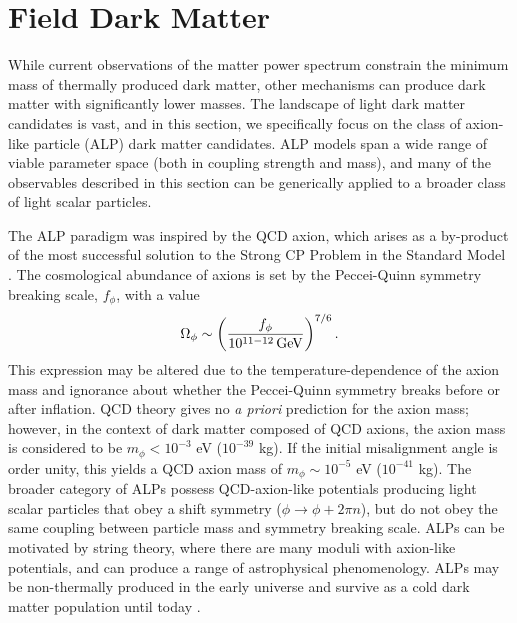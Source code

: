 \section{Field Dark Matter }
\label{sec:axions}

While current observations of the matter power spectrum constrain the minimum mass of thermally produced dark matter, other mechanisms can  produce dark matter with significantly lower masses. The landscape of light dark matter candidates is vast, and in this section, we specifically focus on the class of axion-like particle (ALP) dark matter candidates.
ALP models span a wide range of viable parameter space (both in coupling strength and mass), and many of the observables described in this section can be generically applied to a broader class of light scalar particles.

The ALP paradigm was inspired by the QCD axion, which arises as a by-product of the most successful solution to the Strong CP Problem in the Standard Model \citep{PecceiQuinn:1977}. 
The cosmological abundance of axions is set by the Peccei-Quinn symmetry breaking scale, $f_\phi$, with a value
\begin{equation}
\Omega_\phi\sim\left(\frac{f_\phi}{10^{11-12}\,{\rm GeV}}\right)^{7/6}.
\end{equation}
This expression may be altered due to the temperature-dependence of the axion mass and ignorance about whether the Peccei-Quinn symmetry breaks before or after inflation. 
QCD theory gives no {\it a priori} prediction for the axion mass; however, in the context of dark matter composed of QCD axions, the axion mass is considered to be $m_\phi< 10^{-3}$ eV ($10^{-39}$ kg). 
If the initial misalignment angle is order unity, this yields a QCD axion mass of $m_\phi \sim 10^{-5}$ eV ($10^{-41}$ kg).
The broader category of ALPs possess QCD-axion-like potentials producing light scalar particles that obey a shift symmetry ($\phi \rightarrow \phi + 2\pi n$), but do not obey the same coupling between particle mass and symmetry breaking scale. 
ALPs can be motivated by string theory, where there are many moduli with axion-like potentials, and can produce a range of astrophysical phenomenology.
ALPs may be non-thermally produced in the early universe and survive as a cold dark matter population until today \citep[\eg][]{Arias:2012az}.


